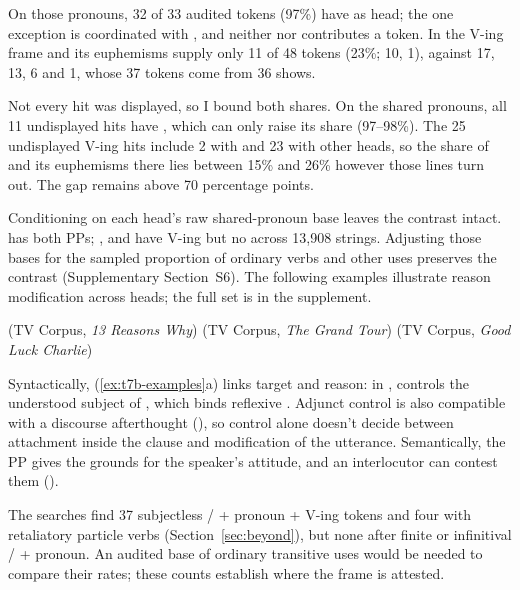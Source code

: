 \documentclass[12pt]{article}
\begin{document}
On those pronouns, 32 of 33 audited  tokens (97\%) have  as head; the one exception is  coordinated with , and neither  nor  contributes a token. In the  V-ing frame  and its euphemisms supply only 11 of 48 tokens (23\%;  10,  1), against  17,  13,  6 and  1, whose 37 tokens come from 36 shows.

Not every hit was displayed, so I bound both shares. On the shared pronouns, all 11 undisplayed  hits have , which can only raise its share (97--98\%). The 25 undisplayed  V-ing hits include 2 with  and 23 with other heads, so the share of  and its euphemisms there lies between 15\% and 26\% however those lines turn out. The gap remains above 70 percentage points.

Conditioning on each head's raw shared-pronoun base leaves the contrast intact.  has both PPs; ,  and  have  V-ing but no  across 13,908 strings. Adjusting those bases for the sampled proportion of ordinary verbs and other uses preserves the contrast (Supplementary Section~S6). The following examples illustrate reason modification across heads; the full set is in the supplement.

\ea\label{ex:t7b-examples}
\ea {} \hfill (TV Corpus, \emph{13 Reasons Why})
\ex {} \hfill (TV Corpus, \emph{The Grand Tour})
\ex {} \hfill (TV Corpus, \emph{Good Luck Charlie})
\z
\z

Syntactically, (\ref{ex:t7b-examples}a) links target and reason: in ,  controls the understood subject of , which binds reflexive . Adjunct control is also compatible with a discourse afterthought (), so control alone doesn't decide between attachment inside the clause and modification of the utterance. Semantically, the PP gives the grounds for the speaker's attitude, and an interlocutor can contest them ().

The searches find 37 subjectless / + pronoun +  V-ing tokens and four with retaliatory particle verbs (Section~\ref{sec:beyond}), but none after finite or infinitival / + pronoun. An audited base of ordinary transitive uses would be needed to compare their rates; these counts establish where the frame is attested.
\end{document}
